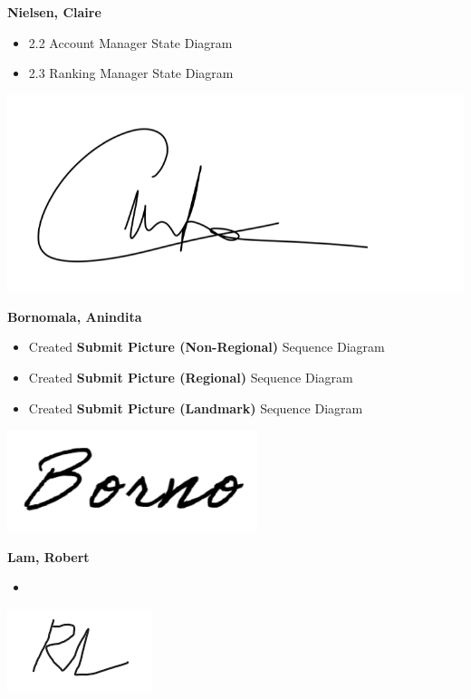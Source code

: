 \documentclass[]{article}
\begin{document}
\textbf{Nielsen, Claire}
\begin{itemize}
    \item 2.2 Account Manager State Diagram
    \item 2.3 Ranking Manager State Diagram
\end{itemize}
\includegraphics[scale=0.15]{clairesignature.jpg}

\textbf{Bornomala, Anindita}
\begin{itemize}
    \item Created \textbf{Submit Picture (Non-Regional)} Sequence Diagram
    \item Created \textbf{Submit Picture (Regional)} Sequence Diagram
    \item Created \textbf{Submit Picture (Landmark)} Sequence Diagram
\end{itemize}
\includegraphics[scale=0.50]{bornosignature.png}

\textbf{Lam, Robert}
\begin{itemize}
    \item
\end{itemize}
\includegraphics[scale=1]{robertsignature.png}


\newpage
\end{document}

